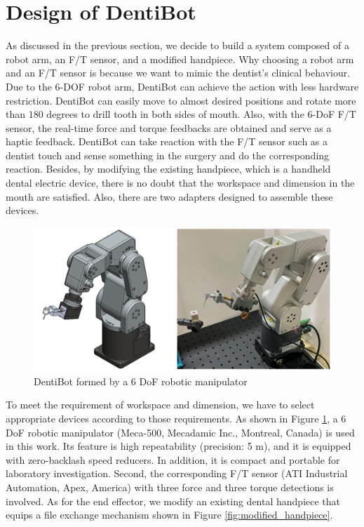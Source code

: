 \section{Design of DentiBot}
\label{sec: design of dentibot}
\vspace{-5mm}
\hspace*{6mm}As discussed in the previous section, we decide to build a system composed of a robot arm, an F/T sensor, and a modified handpiece. Why choosing a robot arm and an F/T sensor is because we want to mimic the dentist's clinical behaviour. Due to the 6-DOF robot arm, DentiBot can achieve the action with less hardware restriction. DentiBot can easily move to almost desired positions and rotate more than $180$ degrees to drill tooth in both sides of mouth. Also, with the 6-DoF F/T sensor, the real-time force and torque feedbacks are obtained and serve as a haptic feedback. DentiBot can take reaction with the F/T sensor such as a dentist touch and sense something in the surgery and do the corresponding reaction. Besides, by modifying the existing handpiece, which is a handheld dental electric device, there is no doubt that the workspace and dimension in the mouth are satisfied. Also, there are two adapters designed to assemble these devices.
\par
\begin{figure}[htbp]
\begin{center}
\includegraphics[width=1\linewidth]{Images/DentiBot.png}
\caption{
DentiBot formed by a 6 DoF robotic manipulator
}\label{fig:DentiBot}
\end{center}
\end{figure}	
To meet the requirement of workspace and dimension, we have to select appropriate devices according to those requirements. As shown in Figure \ref{fig:DentiBot}, a 6 DoF robotic manipulator (Meca-500, Mecadamic Inc., Montreal, Canada) is used in this work. Its feature is high repeatability (precision: 5 \textmu m), and it is equipped with zero-backlash speed reducers. In addition, it is compact and portable for laboratory investigation. Second, the corresponding F/T sensor (ATI Industrial Automation, Apex, America) with three force and three torque detections is involved. As for the end effector, we modify an existing dental handpiece that equips a file exchange mechanism shown in Figure \ref{fig:modified_handpiece}.
